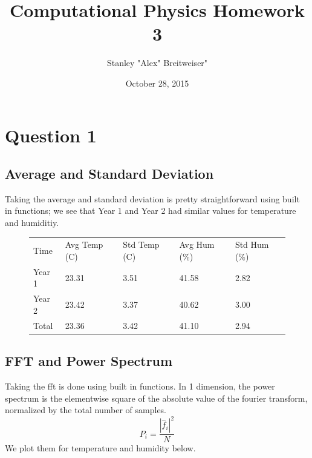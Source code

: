 \documentclass{article}
\title{Computational Physics Homework 3}
\date{October 28, 2015}
\author{Stanley "Alex" Breitweiser"}
\begin{document}
\maketitle

\section{Question 1}
\subsection{Average and Standard Deviation}
Taking the average and standard deviation is pretty straightforward using built in functions; we see that Year 1 and Year 2 had similar values for temperature and humiditiy.

\begin{figure}[H]
\begin{tabular}{l l l l l}
Time & Avg Temp (C) & Std Temp (C) & Avg Hum (\%) & Std Hum (\%) \\
Year 1 & 23.31 & 3.51 & 41.58 & 2.82\\
Year 2 & 23.42 & 3.37 & 40.62 & 3.00\\
Total  &  23.36 & 3.42 & 41.10 & 2.94\\
\end{tabular}
\end{figure}

\subsection{FFT and Power Spectrum}
Taking the fft is done using built in functions. In 1 dimension, the power spectrum is the elementwise square of the absolute value of the fourier transform, normalized by the total number of samples.
$$P_i = \frac{|\hat{f}_i|^2}{N}$$
We plot them for temperature and humidity below.
\end{document}
